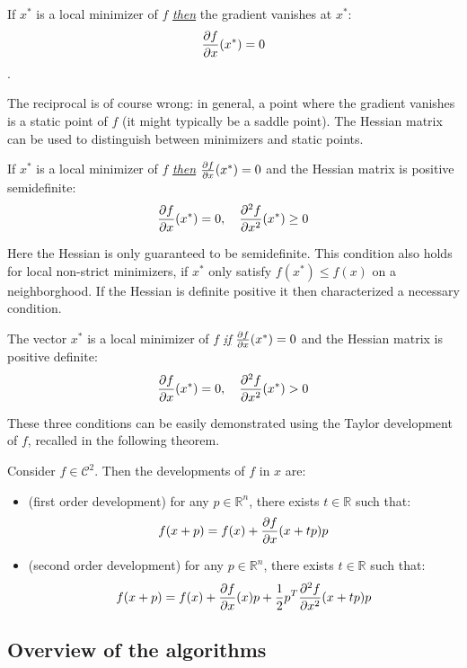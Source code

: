 \documentclass{book}
\begin{document}
\begin{theorem}
  If $x^*$ is a local minimizer of $f$ \emph{\underline{then}} the gradient vanishes at $x^*$: \[\frac{\partial{f}}{\partial{x}}(x^*) = 0\].
\end{theorem}

The reciprocal is of course wrong: in general, a point where the gradient vanishes is a static point of $f$ (it might typically be a saddle point). The Hessian matrix can be used to distinguish between minimizers and static points.

\begin{theorem}
If $x^*$ is a local minimizer of $f$ \emph{\underline{then}} $\frac{\partial{f}}{\partial{x}}(x^*) = 0$ and the Hessian matrix is positive semidefinite: \[ \frac{\partial{f}}{\partial{x}}(x^*) = 0, \quad \frac{\partial^2{f}}{\partial{x}^2}(x^*) \ge 0 \]
\end{theorem}

Here the Hessian is only guaranteed to be semidefinite.
This condition also holds for local non-strict minimizers, \mie if $x^*$ only satisfy $f(x^*) \le f(x)$ on a neighborghood. If the Hessian is definite positive it then characterized a necessary condition. 

\begin{theorem}
The vector $x^*$ is a local minimizer of $f$ \emph{\underline{if}} $\frac{\partial{f}}{\partial{x}}(x^*) = 0$ and the Hessian matrix is positive definite: \[ \frac{\partial{f}}{\partial{x}}(x^*) = 0, \quad  \frac{\partial^2{f}}{\partial{x}^2}(x^*) > 0 \]
\end{theorem}

These three conditions can be easily demonstrated using the Taylor development of $f$, recalled in the following theorem.
\begin{theorem}
Consider $f\in\mathcal{C}^2$. Then the developments of $f$ in $x$ are:
\begin{itemize}
\item (first order development) for any $p\in \mathbb{R}^n$, there exists $t\in\mathbb{R}$ such that:
\[ f(x+p) = f(x) + \frac{\partial{f}}{\partial{x}}(x+tp) p \]
\item (second order development) for any $p\in \mathbb{R}^n$, there exists $t\in\mathbb{R}$ such that:
\[ f(x+p) = f(x) + \frac{\partial{f}}{\partial{x}}(x) p + \frac{1}{2} p^T \frac{\partial^2{f}}{\partial{x}^2}(x+tp)p  \]
\end{itemize}
\end{theorem}

\subsection{Overview of the algorithms}
\end{document}
